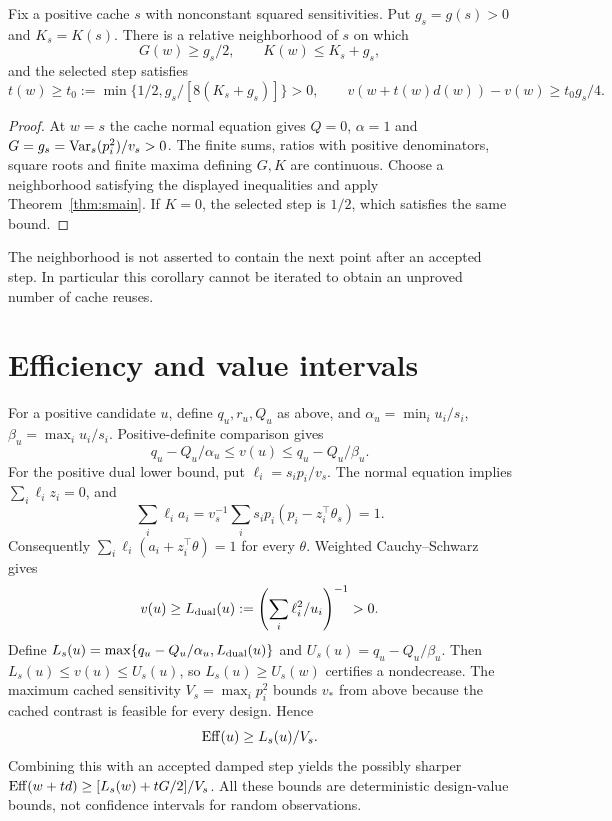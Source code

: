 \documentclass[11pt]{article}
\begin{document}
\begin{corollary}\label{cor:slocal}
Fix a positive cache $s$ with nonconstant squared sensitivities. Put $g_s=g(s)>0$ and $K_s=K(s)$. There is a relative neighborhood of $s$ on which
\[
 G(w)\ge g_s/2,\qquad K(w)\le K_s+g_s,
\]
and the selected step satisfies
\[
 t(w)\ge t_0:=\min\{1/2,g_s/[8(K_s+g_s)]\}>0,
 \qquad v(w+t(w)d(w))-v(w)\ge t_0g_s/4.
\]
\end{corollary}
\begin{proof}
At $w=s$ the cache normal equation gives $Q=0$, $\alpha=1$ and
$G=g_s=\operatorname{Var}_s(p_i^2)/v_s>0$.
The finite sums, ratios with positive denominators, square roots and finite maxima defining $G,K$ are continuous. Choose a neighborhood satisfying the displayed inequalities and apply Theorem~\ref{thm:smain}. If $K=0$, the selected step is $1/2$, which satisfies the same bound.
\end{proof}
The neighborhood is not asserted to contain the next point after an accepted step. In particular this corollary cannot be iterated to obtain an unproved number of cache reuses.

\section{Efficiency and value intervals}
For a positive candidate $u$, define $q_u,r_u,Q_u$ as above, and
$\alpha_u=\min_i u_i/s_i$, $\beta_u=\max_i u_i/s_i$.
Positive-definite comparison gives
\begin{equation}\label{eq:sinterval}
 q_u-Q_u/\alpha_u\le v(u)\le q_u-Q_u/\beta_u.
\end{equation}
For the positive dual lower bound, put $\ell_i=s_i p_i/v_s$.
The normal equation implies $\sum_i\ell_i z_i=0$, and
\[
 \sum_i\ell_i a_i
 =v_s^{-1}\sum_i s_i p_i(p_i-z_i^\top\theta_s)=1.
\]
Consequently $\sum_i\ell_i(a_i+z_i^\top\theta)=1$ for every $\theta$.
Weighted Cauchy--Schwarz gives
\[
 v(u)\ge L_{\rm dual}(u):=
 \left(\sum_i\ell_i^2/u_i\right)^{-1}>0.
\]
Define $L_s(u)=\max\{q_u-Q_u/\alpha_u,L_{\rm dual}(u)\}$ and
$U_s(u)=q_u-Q_u/\beta_u$.
Then $L_s(u)\le v(u)\le U_s(u)$, so $L_s(u)\ge U_s(w)$ certifies a nondecrease.
The maximum cached sensitivity $V_s=\max_i p_i^2$ bounds $v_*$ from above because the cached contrast is feasible for every design. Hence
\begin{equation}\label{eq:seff}
 \operatorname{Eff}(u)\ge L_s(u)/V_s.
\end{equation}
Combining this with an accepted damped step yields the possibly sharper
$\operatorname{Eff}(w+td)\ge[L_s(w)+tG/2]/V_s$.
All these bounds are deterministic design-value bounds, not confidence intervals for random observations.
\end{document}
